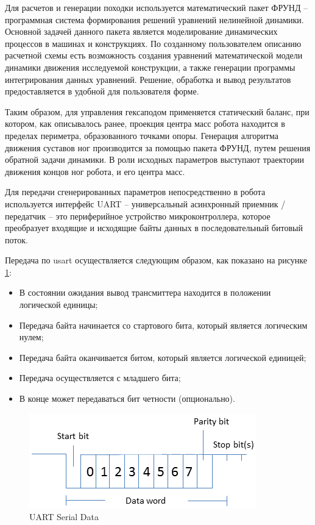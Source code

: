 Для расчетов и генерации походки используется математический пакет ФРУНД – программная система формирования решений уравнений нелинейной динамики. Основной задачей данного пакета является моделирование динамических процессов в машинах и конструкциях. По созданному пользователем описанию расчетной схемы есть возможность создания уравнений математической модели динамики движения исследуемой конструкции, а также генерации программы интегрирования данных уравнений. Решение, обработка и вывод результатов предоставляется в удобной для пользователя форме.

Таким образом, для управления гексаподом применяется статический баланс, при котором, как описывалось ранее, проекция центра масс робота находится в пределах периметра, образованного точками опоры. Генерация алгоритма движения суставов ног производится за помощью пакета ФРУНД, путем решения обратной задачи динамики. В роли исходных параметров выступают траектории движения концов ног робота, и его центра масс.

Для передачи сгенерированных параметров непосредственно в робота используется интерфейс UART – универсальный асинхронный приемник / передатчик – это периферийное устройство микроконтроллера, которое преобразует входящие и исходящие байты данных в последовательный битовый поток. 

Передача по usart осуществляется следующим образом, как показано на рисунке \ref{img:uart}:
\begin{itemize}
	\item В состоянии ожидания вывод трансмиттера находится в положении логической единицы;
	\item Передача байта начинается со стартового бита, который является логическим нулем;
	\item Передача байта оканчивается битом, который является логической единицей;
	\item Передача осуществляется с младшего бита;
	\item В конце может передаваться бит четности (опционально).
\end{itemize}


\begin{figure}[h!]
	\centering
	\includegraphics[width = \linewidth]{img/usart}
	\caption{UART Serial Data}
	\label{img:uart}
\end{figure}

